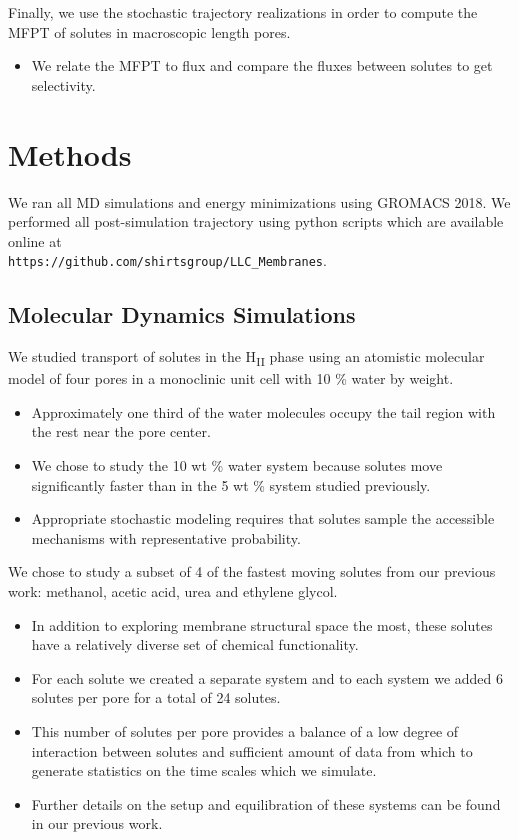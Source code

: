 \documentclass{article}
\begin{document}
  Finally, we use the stochastic trajectory realizations in order to compute the MFPT 
  of solutes in macroscopic length pores.
  \begin{itemize}
  	\item We relate the MFPT to flux and compare the fluxes between solutes to get selectivity.
  \end{itemize}
    
  \section{Methods}
    
  We ran all MD simulations and energy minimizations using GROMACS 2018. We
  performed all post-simulation trajectory using python scripts which are available
  online at \\ \texttt{https://github.com/shirtsgroup/LLC\_Membranes}.

  \subsection{Molecular Dynamics Simulations}
  

  We studied transport of solutes in the H\textsubscript{II} phase using an
  atomistic molecular model of four pores in a monoclinic unit cell with 
  10 \% water by weight. 
  \begin{itemize}
    \item Approximately one third of the water molecules occupy the tail region 
    with the rest near the pore center.
    \item We chose to study the 10 wt \% water system because solutes move 
    significantly faster than in the 5 wt \% system studied previously.
    \item Appropriate stochastic modeling requires that solutes sample the 
    accessible mechanisms with representative probability.
  \end{itemize}
  
  We chose to study a subset of 4 of the fastest moving solutes from our previous
  work: methanol, acetic acid, urea and ethylene glycol.
  \begin{itemize} 
    \item In addition to exploring membrane structural space the most, these solutes
    have a relatively diverse set of chemical functionality.   
    \item For each solute we created a separate system and to each system we
    added 6 solutes per pore for a total of 24 solutes.
    \item This number of solutes per pore provides a balance of a low 
    degree of interaction between solutes and sufficient amount of data from
    which to generate statistics on the time scales which we simulate.
    \item Further details on the setup and equilibration of these systems can
    be found in our previous work.\cite{coscia_chemically_2019}
  \end{itemize}
  
\end{document}
